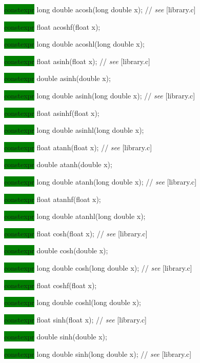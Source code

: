\documentclass[prd,twocolumn,amsmath,amssymb,nofootinbib,eqsecnum]{revtex4-1}
\newcommand{\highlight}[1]{\colorbox{green}{\!\!\!\! #1}}
\newcommand{\stdcomment}[1]{{// {\it see} [#1]}}
\begin{document}
{\highlight{constexpr} long double acosh(long double x); \stdcomment{library.c}

\highlight{constexpr} float acoshf(float x);

\highlight{constexpr} long double acoshl(long double x);

\vspace{2ex}


\highlight{constexpr} float asinh(float x); \stdcomment{library.c}

\highlight{constexpr} double asinh(double x);

\highlight{constexpr} long double asinh(long double x); \stdcomment{library.c}

\highlight{constexpr} float asinhf(float x);

\highlight{constexpr} long double asinhl(long double x);

\vspace{2ex}


\highlight{constexpr} float atanh(float x); \stdcomment{library.c}

\highlight{constexpr} double atanh(double x);

\highlight{constexpr} long double atanh(long double x); \stdcomment{library.c}

\highlight{constexpr} float atanhf(float x);

\highlight{constexpr} long double atanhl(long double x);

\vspace{2ex}


\highlight{constexpr} float cosh(float x); \stdcomment{library.c}

\highlight{constexpr} double cosh(double x);

\highlight{constexpr} long double cosh(long double x); \stdcomment{library.c}

\highlight{constexpr} float coshf(float x);

\highlight{constexpr} long double coshl(long double x);

\vspace{2ex}


\highlight{constexpr} float sinh(float x); \stdcomment{library.c}

\highlight{constexpr} double sinh(double x);

\highlight{constexpr} long double sinh(long double x); \stdcomment{library.c}

}
\end{document}
